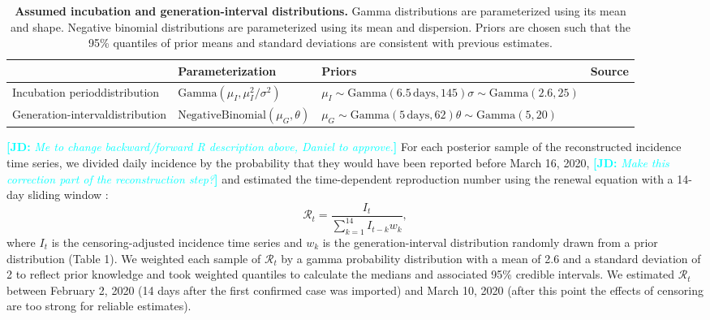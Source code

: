 \documentclass[12pt]{article}
\newcommand{\comment}{\showcomment}
\newcommand{\showcomment}[3]{\textcolor{#1}{\textbf{[#2: }\textsl{#3}\textbf{]}}}
\newcommand{\jd}[1]{\comment{cyan}{JD}{#1}}
\begin{document}
\begin{table}[t]
\begin{center}
\small
\begin{tabular}{p{4cm}|p{4.5cm}|p{4.7cm}|l}
 & Parameterization & Priors & Source \\
\hline
Incubation period\newline distribution & $\mathrm{Gamma}(\mu_I, \mu_I^2/\sigma^2)$ & $\mu_I\sim \mathrm{Gamma}(6.5\,\textrm{days}, 145)$\newline$\sigma\sim \mathrm{Gamma}(2.6, 25)$ & \citep{backer2020incubation} \\
\hline
Generation-interval\newline distribution & $\mathrm{NegativeBinomial}(\mu_G, \theta)$ & $\mu_G\sim\mathrm{Gamma}(5\,\textrm{days},62)$\newline$\theta\sim\mathrm{Gamma}(5,20)$ & \citep{ferretti2020quantifying, ganyani2020estimating} \\
\hline
\end{tabular}
\end{center}
\caption{
\textbf{Assumed incubation and generation-interval distributions.}
Gamma distributions are parameterized using its mean and shape.
Negative binomial distributions are parameterized using its mean and dispersion.
Priors are chosen such that the 95\% quantiles of prior means and standard deviations are consistent with previous estimates.
}
\end{table}

\jd{Me to change backward/forward R description above, Daniel to approve.}
For each posterior sample of the reconstructed incidence time series, we divided daily incidence by the probability that they would have been reported before March 16, 2020, \jd{Make this correction part of the reconstruction step?} and estimated the time-dependent reproduction number using the renewal equation with a 14-day sliding window \citep{fraser2007estimating}:
\begin{equation}
\mathcal R_t = \frac{I_t}{\sum_{k=1}^{14} I_{t-k} w_k},
\end{equation}
where $I_t$ is the censoring-adjusted incidence time series and $w_k$ is the generation-interval distribution randomly drawn from a prior distribution (Table 1).
We weighted each sample of $\mathcal R_t$ by a gamma probability distribution with a mean of 2.6 and a standard deviation of 2 to reflect prior knowledge \citep{tempvar} and took weighted quantiles to calculate the medians and associated 95\% credible intervals.
We estimated $\mathcal R_t$ between February 2, 2020 (14 days after the first confirmed case was imported) and March 10, 2020 (after this point the effects of censoring are too strong for reliable estimates).
\end{document}
